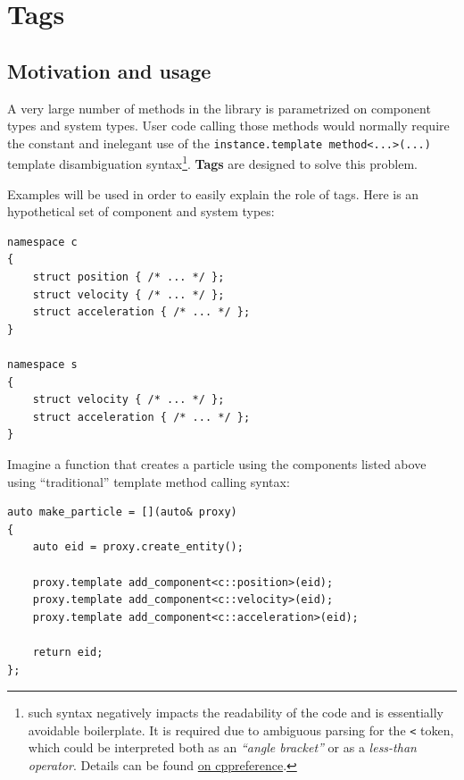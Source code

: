 \documentclass[oneside, 12pt, a4paper, openany]{book}
\begin{document}
\hypertarget{metaprogramming_tags}{\section{Tags}\label{metaprogramming_tags}}

\subsection{Motivation and usage}\label{motivation-and-usage}

A very large number of methods in the library is parametrized on
component types and system types. User code calling those methods would
normally require the constant and inelegant use of the
\texttt{instance.template method<...>(...)}
template disambiguation syntax\footnote{such syntax negatively impacts
  the readability of the code and is essentially avoidable boilerplate.
  It is required due to ambiguous parsing for the
  \texttt{<}
  token, which could be interpreted both as an \emph{``angle bracket''}
  or as a \emph{less-than operator}. Details can be found
  \href{http://en.cppreference.com/w/cpp/language/dependent_name\#The_template_disambiguator_for_dependent_names}{on
  cppreference}.}. \textbf{Tags} are designed to solve this problem.

Examples will be used in order to easily explain the role of tags. Here
is an hypothetical set of component and system types:

\begin{verbatim}
namespace c
{
    struct position { /* ... */ };
    struct velocity { /* ... */ };
    struct acceleration { /* ... */ };
}

namespace s
{
    struct velocity { /* ... */ };
    struct acceleration { /* ... */ };
}
\end{verbatim}

Imagine a function that creates a particle using the components listed
above using ``traditional'' template method calling syntax:

\begin{verbatim}
auto make_particle = [](auto& proxy)
{
    auto eid = proxy.create_entity();

    proxy.template add_component<c::position>(eid);
    proxy.template add_component<c::velocity>(eid);
    proxy.template add_component<c::acceleration>(eid);

    return eid;
};
\end{verbatim}
\end{document}
